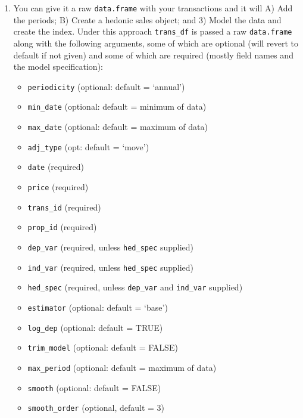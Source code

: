 \documentclass[]{article}
\providecommand{\tightlist}{%
  \setlength{\itemsep}{0pt}\setlength{\parskip}{0pt}}
\begin{document}
\begin{enumerate}
\def\labelenumi{\arabic{enumi}.}
\item
  You can give it a raw \texttt{data.frame} with your transactions and
  it will A) Add the periods; B) Create a hedonic sales object; and 3)
  Model the data and create the index. Under this approach
  \texttt{trans\_df} is passed a raw \texttt{data.frame} along with the
  following arguments, some of which are optional (will revert to
  default if not given) and some of which are required (mostly field
  names and the model specification):

  \begin{itemize}
  \tightlist
  \item
    \texttt{periodicity} (optional: default = `annual')
  \item
    \texttt{min\_date} (optional: default = minimum of data)
  \item
    \texttt{max\_date} (optional: default = maximum of data)
  \item
    \texttt{adj\_type} (opt: default = `move')
  \item
    \texttt{date} (required)
  \item
    \texttt{price} (required)
  \item
    \texttt{trans\_id} (required)
  \item
    \texttt{prop\_id} (required)
  \item
    \texttt{dep\_var} (required, unless \texttt{hed\_spec} supplied)
  \item
    \texttt{ind\_var} (required, unless \texttt{hed\_spec} supplied)
  \item
    \texttt{hed\_spec} (required, unless \texttt{dep\_var} and
    \texttt{ind\_var} supplied)
  \item
    \texttt{estimator} (optional: default = `base')
  \item
    \texttt{log\_dep} (optional: default = TRUE)
  \item
    \texttt{trim\_model} (optional: default = FALSE)
  \item
    \texttt{max\_period} (optional: default = maximum of data)
  \item
    \texttt{smooth} (optional: default = FALSE)
  \item
    \texttt{smooth\_order} (optional, default = 3)
  \end{itemize}
\end{enumerate}
\end{document}
